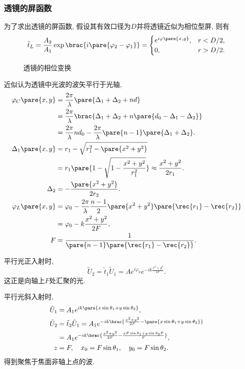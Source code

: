 \documentclass{ctexart}
\begin{document}

\subsubsection{透镜的屏函数} %
\label{ssub:透镜的屏函数}

为了求出透镜的屏函数, 假设其有效口径为$D$并将透镜近似为相位型屏, 则有
\[ \tilde{t}_L = \frac{A_2}{A_1} \exp\brac{i\pare{\varphi_2 - \varphi_1}} = \begin{cases}
    e^{i\varphi\pare{x,y}},& r<D/2, \\
    0,& r>D/2.
\end{cases} \]
\begin{figure}[ht]
    \centering
    \caption{透镜的相位变换}
\end{figure}
近似认为透镜中光波的波矢平行于光轴,
\begin{align*}
    \varphi_C\pare{x,y} &= \frac{2\pi}{\lambda} \pare{\Delta_1 + \Delta_2 + nd} \\
    &= \frac{2\pi}{\lambda} \brac{\Delta_1 + \Delta_2 + n\pare{d_0 - \Delta_1 - \Delta_2}} \\
    &= \frac{2\pi}{\lambda} nd_0 - \frac{2\pi}{\lambda} \pare{n-1}\pare{\Delta_1 + \Delta_2}. \\
    \Delta_1 \pare{x,y} &= r_1 - \sqrt{r_1^2 - \pare{x^2+y^2}} \\
    &= r_1 \pare{1-\sqrt{1-\frac{x^2+y^2}{r^2_1}}} \approx \frac{x^2+y^2}{2r_1}. \\
    \Delta_2 &= -\frac{\pare{x^2+y^2}}{2r_2}. \\
    \varphi_L \pare{x,y} &= \varphi_0 - \frac{2\pi}{\lambda} \frac{n-1}{2}\pare{x^2+y^2}\pare{\rec{r_1} - \rec{r_2}} \\
    &= \varphi_0 - k \frac{x^2+y^2}{2F}, \\
    F &= \frac{1}{\pare{n-1}\pare{\rec{r_1} - \rec{r_2}}}.
\end{align*}
\begin{sample}
    \begin{ex}
        平行光正入射时,
        \[ \tilde{U}_2 = \tilde{t}_1 \tilde{U}_1 = Ae^{i\varphi_0} e^{-ik \frac{x^2+y^2}{2F}}. \]
        这正是向轴上$F$处汇聚的光.
    \end{ex}
\end{sample}
\begin{sample}
    \begin{ex}
        平行光斜入射时,
        \begin{align*}
            \tilde{U}_1 &= A_1 e^{ik \pare{x\sin\theta_1 + y\sin\theta_2}},\\
            \tilde{U}_2 &= \tilde{t}_2 \tilde{U}_1 = A_1 e^{-ik\brac{\frac{x^2+y^2}{2F} - \pare{x\sin\theta_1 + y\sin\theta_2}}} \\
            &= A_1 e^{-ik\brac{\frac{x^2+y^2}{2F} - \frac{xF\sin\theta_1 + y\sin\theta_2 F}{F}}}, \\
            z&=F,\quad x_0 = F\sin\theta_1,\quad y_0 = F \sin\theta_2.
        \end{align*}
        得到聚焦于焦面非轴上点的波.
    \end{ex}
\end{sample}
\end{document}
